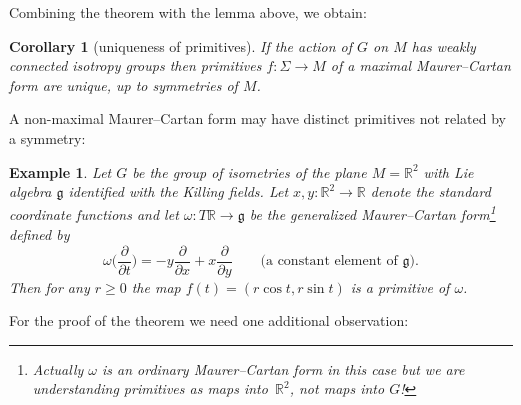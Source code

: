 \documentclass[11pt]{article}
\numberwithin{equation}{section}
\numberwithin{equation}{section}
\newtheorem{Corollary}[Theorem]{Corollary}
\newtheorem{Example}[Theorem]{Example}
\renewcommand{\ge}{\geqslant}
\begin{document}
Combining the theorem with the lemma above, we obtain:
\begin{Corollary}[uniqueness of primitives]\label{uniquenessC}
 If the action of $G$ on $M$ has weakly connected isotropy groups
 then primitives $f \colon \Sigma \rightarrow M$ of a maximal
 Maurer--Cartan form are unique, up to symmetries of $M$.
\end{Corollary}

A non-maximal Maurer--Cartan form may have distinct primitives not
related by a symmetry:
\begin{Example} Let $G$ be the group of isometries of the plane
$M={\mathbb R}^2 $ with Lie algebra ${\mathfrak g} $ identified with
the Killing fields. Let $x, y \colon {\mathbb R}^2 \rightarrow
{\mathbb R} $ denote the standard coordinate functions and let $
\omega \colon T {\mathbb R} \rightarrow {\mathfrak g} $ be the
generalized Maurer--Cartan form\footnote{Actually $\omega $ is an
ordinary Maurer--Cartan form in this case but we are understanding
primitives as maps into~${\mathbb R}^2$, not maps into $G$!} defined
by
\begin{equation*}
\omega \bigg( \frac{\partial }{\partial t}\bigg)=
-y\frac{\partial }{\partial x }+x \frac{\partial }{\partial y}
\qquad\text{(a constant element of $\mathfrak g$).}
 \end{equation*}
 Then for any $r\ge 0$ the map $f (t)=(r\cos t, r\sin
t)$ is a primitive of $\omega $.
\end{Example}

For the proof of the theorem we need one additional observation:
\end{document}
